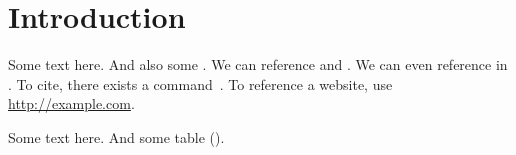 \section{Introduction}
\label{sec:intro}

Some text here. And also some .
We can reference  and .
We can even reference  in . %
To cite, there exists a command~\cite{driller,fans}.
To reference a website, use \url{http://example.com}.




Some text here. And some table ().


